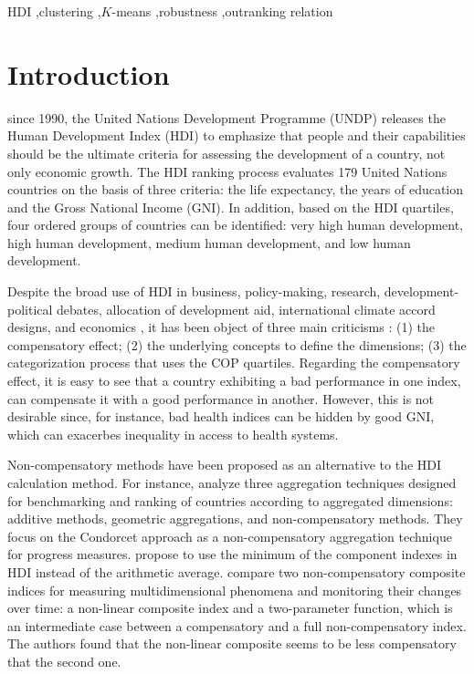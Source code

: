 \documentclass[]{elsarticle}
\theoremstyle{definition}
\begin{document}
\begin{frontmatter}
\begin{keyword}
HDI \sep clustering \sep $K$-means \sep robustness \sep outranking relation 
\end{keyword}

\end{frontmatter}


\section{Introduction}

since 1990, the United Nations Development Programme (UNDP) releases the Human Development Index (HDI) to emphasize that people and their capabilities should be the ultimate criteria for assessing the development of a country, not only economic growth. The HDI ranking process evaluates  179 United Nations countries on the basis of three criteria: the life expectancy, the years of education and the Gross National Income (GNI). In addition, based on the HDI quartiles, four ordered groups of countries can be identified: very high human development, high human development, medium human development, and low human development.  

Despite the broad use of HDI  in business, policy-making, research, development-political debates, allocation of development aid, international climate accord designs, and economics \citep{Wolff2011}, it has been object of three main criticisms \citep{Noorbakhsh1998, Berenger2007, Klugman2011, Martinez2013}: (1) the compensatory effect; (2) the underlying concepts to define the dimensions; (3) the categorization process that uses the COP quartiles.  Regarding the compensatory effect, it is easy to see that a country exhibiting a bad performance in one index, can compensate it with a good performance in another. However, this is not desirable since, for instance, bad health indices can be hidden by good GNI, which can exacerbes inequality in access to health systems.   

Non-compensatory  methods have been proposed as an alternative to the HDI calculation method. For instance, \cite{Natoli2011} analyze three aggregation techniques designed for benchmarking and ranking of countries according to aggregated dimensions: additive methods, geometric aggregations, and non-compensatory methods.  They focus on the Condorcet approach as a non-compensatory aggregation technique for progress measures.  \cite{Lozano2009} propose to use the minimum of the component indexes in HDI instead of the arithmetic average. \cite{Mazziotta2015} compare two non-compensatory composite indices for measuring multidimensional phenomena and monitoring their changes over time: a non-linear composite index and a two-parameter function, which is an intermediate case between a compensatory and a full non-compensatory index. The authors found that the non-linear composite seems to be less compensatory that the second one.
\end{document}
